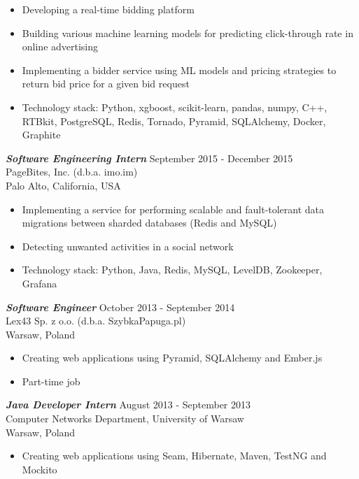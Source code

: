 \documentclass[margin, 10pt]{res} %
\begin{document}
\begin{resume}
\begin{itemize} \itemsep -2pt %
\item Developing a real-time bidding platform
\item Building various machine learning models for predicting click-through rate in online advertising
\item Implementing a bidder service using ML models and pricing strategies to return bid price for a given bid request
\item Technology stack: Python, xgboost, scikit-learn, pandas, numpy, C++, RTBkit, PostgreSQL, Redis, Tornado, Pyramid, SQLAlchemy, Docker, Graphite
\end{itemize}

{\sl \bf Software Engineering Intern} \hfill September 2015 - December 2015 \\
PageBites, Inc. (d.b.a. imo.im) \\
Palo Alto, California, USA

\begin{itemize} \itemsep -2pt %
\item Implementing a service for performing scalable and fault-tolerant data migrations between sharded databases (Redis and MySQL) 
\item Detecting unwanted activities in a social network
\item Technology stack: Python, Java, Redis, MySQL, LevelDB, Zookeeper, Grafana
\end{itemize}


{\sl \bf Software Engineer} \hfill October 2013 - September 2014 \\
Lex43 Sp. z o.o. (d.b.a. SzybkaPapuga.pl) \\
Warsaw, Poland

\begin{itemize} \itemsep -2pt %
\item Creating web applications using Pyramid, SQLAlchemy and Ember.js
\item Part-time job
\end{itemize}
 
{\sl \bf Java Developer Intern } \hfill August 2013 - September 2013 \\
Computer Networks Department, University of Warsaw \\
Warsaw, Poland
\begin{itemize} 
\item Creating web applications using Seam, Hibernate, Maven, TestNG and Mockito
\end{itemize}


\end{resume}
\end{document}
